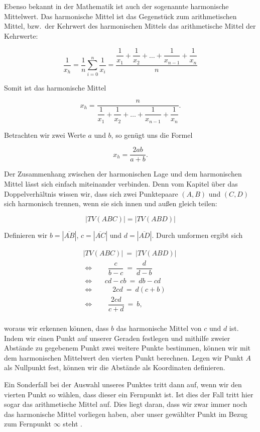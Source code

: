 \documentclass[12pt,a4paper]{article}
\begin{document}
Ebenso bekannt in der Mathematik ist auch der sogenannte harmonische Mittelwert. Das harmonische Mittel ist das Gegenstück zum arithmetischen Mittel, bzw.~der Kehrwert des harmonischen Mittels das arithmetische Mittel der Kehrwerte:

\[ \dfrac{1}{x_h} = \dfrac{1}{n} \sum_{i=0}^n \dfrac{1}{x_i} = \dfrac{\dfrac{1}{x_1} + \dfrac{1}{x_2} + \dots + \dfrac{1}{x_{n-1}} + \dfrac{1}{x_n}}{n}\]

Somit ist das harmonische Mittel

\[ x_h = \dfrac{n}{\dfrac{1}{x_1} + \dfrac{1}{x_2} + \dots + \dfrac{1}{x_{n-1}} + \dfrac{1}{x_n}}.\]

Betrachten wir zwei Werte $a$ und $b$, so genügt uns die Formel

\[ x_h = \dfrac{2ab}{a+b}.\]

Der Zusammenhang zwischen der harmonischen Lage und dem harmonischen Mittel lässt sich einfach miteinander verbinden. Denn vom Kapitel über das Doppelverhältnis wissen wir, dass sich zwei Punktepaare $(A, B)$ und $(C, D)$ sich harmonisch trennen, wenn sie sich innen und außen gleich teilen:

\[|TV(A B C)| = |TV(A B D)|\]

Definieren wir $b = |\overline{A B}|$, $c = |\overline{A C}|$ und $d = |\overline{A D}|$. Durch umformen ergibt sich

\begin{equation*}
\begin{split}
|TV(A B C)|~=~|TV(A B D)| ~\\
\Longleftrightarrow ~~~~~~~~~\dfrac{c}{b-c}~=~\dfrac{d}{d-b}~~~~~~~~~~\\
\Longleftrightarrow ~~~~~~~cd-cb~=~db-cd~~~~~~~~\\
\Longleftrightarrow ~~~~~~~~~~~~2 cd~=~d (c+b)~~~~~~~\\
\Longleftrightarrow ~~~~~~~~~\dfrac{2cd}{c+d}~=~b,~~~~~~~~~~~~~~~\\
\end{split}
\end{equation*}

woraus wir erkennen können, dass $b$ das harmonische Mittel von $c$ und $d$ ist. Indem wir einen Punkt auf unserer Geraden festlegen und mithilfe zweier Abstände zu gegebenem Punkt zwei weitere Punkte bestimmen, können wir mit dem harmonischen Mittelwert den vierten Punkt berechnen. Legen wir Punkt $A$ als Nullpunkt fest, können wir die Abstände als Koordinaten definieren.

Ein Sonderfall bei der Auswahl unseres Punktes tritt dann auf, wenn wir den vierten Punkt so wählen, dass dieser ein Fernpunkt ist. Ist dies der Fall tritt hier sogar das arithmetische Mittel auf. Dies liegt daran, dass wir zwar immer noch das harmonische Mittel vorliegen haben, aber unser gewählter Punkt im Bezug zum Fernpunkt $\infty$ steht \citep[s.][S.~44]{harmonischeLage}.
\end{document}
